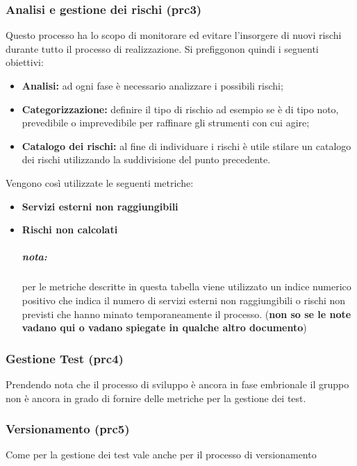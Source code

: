 \subsubsection{Analisi e gestione dei rischi (prc3)}
Questo processo ha lo scopo di monitorare ed evitare l'insorgere di nuovi rischi durante tutto il processo di realizzazione. Si prefiggonon quindi i seguenti obiettivi:
\begin{itemize}
	\item{\textbf{Analisi:} ad ogni fase è necessario analizzare i possibili rischi;}
	\item{\textbf{Categorizzazione:}  definire il tipo di rischio ad esempio se è di tipo noto, prevedibile o imprevedibile per raffinare gli strumenti con cui agire;}
	\item{\textbf{Catalogo dei rischi:} al fine di individuare i rischi è utile stilare un catalogo dei rischi utilizzando la suddivisione del punto precedente.}
\end{itemize}
Vengono così utilizzate le seguenti metriche: 
\begin{itemize}
	\item{\textbf{Servizi esterni non raggiungibili}}
	\item{\textbf{Rischi non calcolati}}
	\subparagraph{nota:} per le metriche descritte in questa tabella viene utilizzato un indice numerico positivo che indica il numero di servizi esterni non raggiungibili o rischi non previsti che hanno minato temporaneamente il processo. (\textbf{non so se le note vadano qui o vadano spiegate in qualche altro documento})
\end{itemize}
\begin{table}[!htbp]
	\centering
	\renewcommand{\arraystretch}{2} 
	\caption{TBD}
\end{table}
\newpage
\subsubsection{Gestione Test (prc4)}
Prendendo nota che il processo di sviluppo è ancora in fase embrionale il gruppo non è ancora in grado di fornire delle metriche per la gestione dei test.
\subsubsection{Versionamento (prc5)}
Come per la gestione dei test vale anche per il processo di versionamento